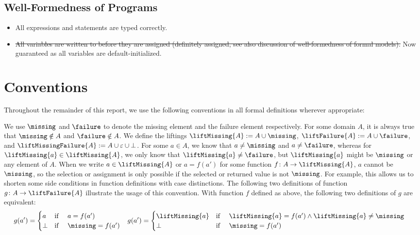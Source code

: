 \documentclass[a4paper,10pt,english]{article}
\begin{document}
\subsection{Well-Formedness of \Fil Programs}
\begin{itemize}
	\item All expressions and statements are typed correctly.
	\item \st{All variables are written to before they are assigned (definitely assigned, see also discussion of well-formedness of
	formal models).} Now guaranteed as all variables are default-initialized.
\end{itemize}

\section{Conventions}
Throughout the remainder of this report, we use the following conventions in all formal definitions wherever appropriate:

	We use $\missing$ and $\failure$ to denote the missing element and the failure element respectively. For some domain $A$, it is
	always true that $\missing \notin A$ and $\failure \notin A$. We define the liftings $\liftMissing{A} := A \cup
	\missing$, $\liftFailure{A} := A \cup \failure$, and $\liftMissingFailure{A} := A \cup \varepsilon \cup	\bot$.
	For some $a \in A$, we know that $a \neq \missing$ and $a \neq \failure$, whereas for $\liftMissing{a} \in
	\liftMissing{A}$, we only know that $\liftMissing{a} \neq \failure$, but $\liftMissing{a}$ might be $\missing$ or
	any element of $A$. When we write $a \in \liftMissing{A}$ or $a = f(a')$ for some function $f \colon A \rightarrow
	\liftMissing{A}$, $a$ cannot be $\missing$, so the selection or assignment is only possible if the selected or
	returned value is not $\missing$. For example, this allows us to shorten some side conditions in function definitions with case
	distinctions. The following two definitions of function $g \colon A \rightarrow \liftFailure{A}$ illustrate the usage of this
	convention.
	With function $f$ defined as above, the following two definitions of $g$ are equivalent:
	\begin{align*}
		g(a') = \begin{cases}
			a & \text{if } \quad a = f(a') \\
			\bot & \text{if } \quad \missing = f(a')
		\end{cases} 
		&&&
		g(a') = \begin{cases}
			\liftMissing{a} & \text{if } \quad \liftMissing{a} = f(a') \wedge \liftMissing{a} \neq \missing	\\
			\bot & \text{if } \quad \missing = f(a')
		\end{cases}
	\end{align*}
\end{document}
